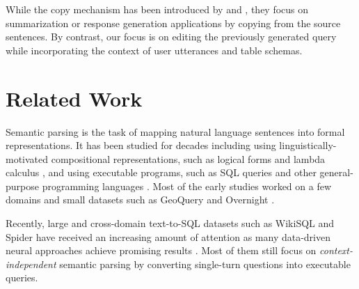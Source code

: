 \documentclass[11pt,a4paper]{article}
\begin{document}
While the copy mechanism has been introduced by  and , they focus on summarization or response generation applications by copying from the source sentences.
By contrast, our focus is on editing the previously generated query while incorporating the context of user utterances and table schemas. 

\vspace{-2mm}
\section{Related Work}
\vspace{-2mm}
Semantic parsing is the task of mapping natural language sentences into formal representations.
It has been studied for decades including using linguistically-motivated compositional representations, such as logical forms \cite{zelle96,clarke2010driving} and lambda calculus \cite{zettlemoyer2005learning,artzi2011bootstrapping}, and using executable programs, such as SQL queries \cite{miller1996fully,zhong2017seq} and other general-purpose programming languages \cite{yin2017syntactic,iyer2018mapping}.
Most of the early studies worked on a few domains and small datasets such as GeoQuery \cite{zelle96} and Overnight \cite{wang2015building}.

Recently, large and cross-domain text-to-SQL datasets such as WikiSQL \cite{zhong2017seq} and Spider \cite{yu2018spider} have received an increasing amount of attention as many data-driven neural approaches achieve promising results \cite{dong2016language, su2017cross, iyer2017learning, xu2017sqlnet, dollak2018improving, yu2018typesql, huang2018natural, dong2018coarse, sun2018semantic, gur2018dialsql, guo2018question, yavuz2018takes, shi2018incsql}.
Most of them still focus on \textit{context-independent} semantic parsing by converting single-turn questions into executable queries.
\end{document}
